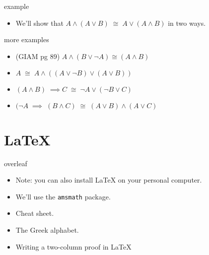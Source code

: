 \documentclass[landscape]{beamer}
\begin{document}
\begin{frame}{example}
\begin{itemize}
\item We'll show that $A \land (A \lor B) \; \cong \; A \lor (A \land B)$ in two ways.
\end{itemize}
\end{frame}

\begin{frame}{more examples}
\begin{itemize}
\item \rule{0pt}{24pt} (GIAM pg 89) \hspace{3ex} $A \land (B \lor \lnot A) \cong (A \land B)$
\item \rule{0pt}{24pt} $A \; \cong \; A \land ((A \lor {\lnot}B) \lor (A \lor B))$
\item \rule{0pt}{24pt} $(A \land B) \; \implies C \; \cong \; \lnot A \lor (\lnot B \lor C) $
\item \rule{0pt}{24pt} $(\lnot A  \; \implies \; (B \land C) \; \cong \;  (A \lor B) \land (A \lor C) $

\end{itemize}
\end{frame}

\section{LaTeX}

\begin{frame}{overleaf}
\begin{itemize}
\item Note: you can also install LaTeX on your personal computer. \pause
\item We'll use the {\tt amsmath} package. \pause
\item Cheat sheet. \pause
\item The Greek alphabet. \pause
\item Writing a two-column proof in LaTeX \pause

\end{itemize}
\end{frame}
\end{document}
